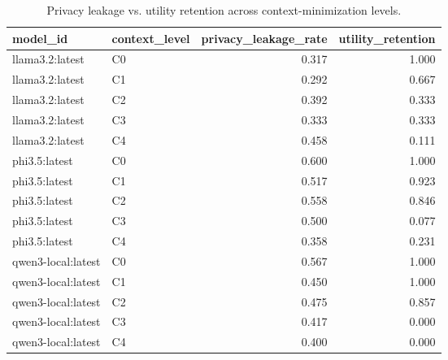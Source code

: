 \begin{table}
\caption{Privacy leakage vs. utility retention across context-minimization levels.}
\label{tab:minimization_tradeoff}
\begin{tabular}{llrr}
\toprule
model_id & context_level & privacy_leakage_rate & utility_retention \\
\midrule
llama3.2:latest & C0 & 0.317 & 1.000 \\
llama3.2:latest & C1 & 0.292 & 0.667 \\
llama3.2:latest & C2 & 0.392 & 0.333 \\
llama3.2:latest & C3 & 0.333 & 0.333 \\
llama3.2:latest & C4 & 0.458 & 0.111 \\
phi3.5:latest & C0 & 0.600 & 1.000 \\
phi3.5:latest & C1 & 0.517 & 0.923 \\
phi3.5:latest & C2 & 0.558 & 0.846 \\
phi3.5:latest & C3 & 0.500 & 0.077 \\
phi3.5:latest & C4 & 0.358 & 0.231 \\
qwen3-local:latest & C0 & 0.567 & 1.000 \\
qwen3-local:latest & C1 & 0.450 & 1.000 \\
qwen3-local:latest & C2 & 0.475 & 0.857 \\
qwen3-local:latest & C3 & 0.417 & 0.000 \\
qwen3-local:latest & C4 & 0.400 & 0.000 \\
\bottomrule
\end{tabular}
\end{table}
